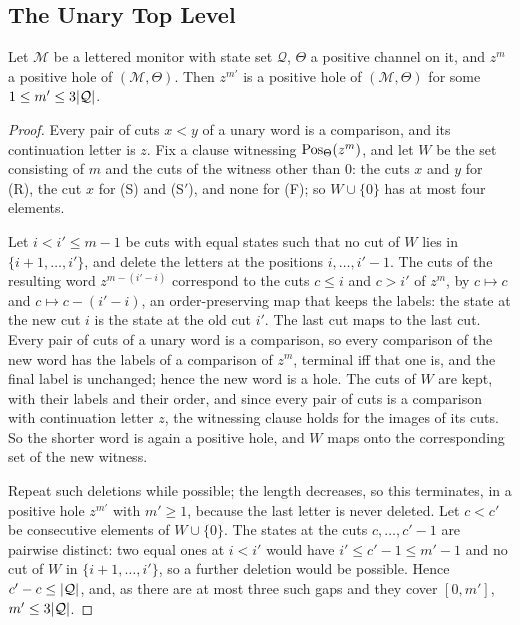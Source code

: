 \subsection{The Unary Top Level}\label{app:mo-unary}

\begin{lemma}\label{lem:mo-unary}
Let $\mathcal M$ be a lettered monitor with state set $\mathcal Q$, $\Theta$ a
positive channel on it, and $z^m$ a positive hole of $(\mathcal M,\Theta)$.
Then $z^{m'}$ is a positive hole of $(\mathcal M,\Theta)$ for some
$1\le m'\le3\lvert \mathcal Q\rvert$.
\end{lemma}

\begin{proof}
Every pair of cuts $x<y$ of a unary word is a comparison, and its continuation
letter is $z$. Fix a clause witnessing $\operatorname{Pos}_\Theta(z^m)$, and let $W$ be the
set consisting of $m$ and the cuts of the witness other than $0$: the cuts $x$
and $y$ for (R), the cut $x$ for (S) and (S$'$), and none for (F); so $W\cup\{0\}$
has at most four elements.

Let $i<i'\le m-1$ be cuts with equal states such that no cut of $W$ lies in
$\{i+1,\ldots,i'\}$, and delete the letters at the positions $i,\ldots,i'-1$.
The cuts of the resulting word $z^{m-(i'-i)}$ correspond to the cuts $c\le i$
and $c>i'$ of $z^m$, by $c\mapsto c$ and $c\mapsto c-(i'-i)$, an
order-preserving map that keeps the labels: the state at the new cut $i$ is the
state at the old cut $i'$. The last cut maps to the last cut. Every pair of
cuts of a unary word is a comparison, so every comparison of the new word has
the labels of a comparison of $z^m$, terminal iff that one is, and the final
label is unchanged; hence the new word is a hole. The cuts of $W$ are kept,
with their labels and their order, and since every pair of cuts is a
comparison with continuation letter $z$, the witnessing clause holds for the
images of its cuts. So the shorter word is again a positive hole, and $W$ maps
onto the corresponding set of the new witness.

Repeat such deletions while possible; the length decreases, so this terminates,
in a positive hole $z^{m'}$ with $m'\ge1$, because the last letter is never
deleted. Let $c<c'$ be consecutive elements of $W\cup\{0\}$. The states at the
cuts $c,\ldots,c'-1$ are pairwise distinct: two equal ones at $i<i'$ would have
$i'\le c'-1\le m'-1$ and no cut of $W$ in $\{i+1,\ldots,i'\}$, so a further
deletion would be possible. Hence $c'-c\le\lvert \mathcal Q\rvert$, and, as there are at
most three such gaps and they cover $[0,m']$, $m'\le3\lvert \mathcal Q\rvert$.
\end{proof}


